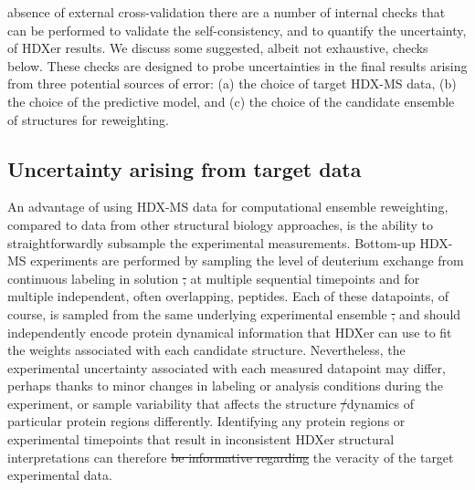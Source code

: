 \documentclass[9pt,tutorial]{livecoms}
\providecommand{\DIFadd}[1]{{\protect\color{blue}\uwave{#1}}} %
\providecommand{\DIFdel}[1]{{\protect\color{red}\sout{#1}}}                      %
\providecommand{\DIFaddbegin}{} %
\providecommand{\DIFaddend}{} %
\providecommand{\DIFdelbegin}{} %
\providecommand{\DIFdelend}{} %
\begin{document}
\DIFadd{In the }\DIFaddend absence of external cross-validation there are a number of internal checks that can be performed to validate the self-consistency, and to quantify the uncertainty, of HDXer results.
We discuss some suggested, albeit not exhaustive, checks below.
These checks are designed to probe uncertainties in the final results arising from three potential sources of error: (a) the choice of target HDX-MS data, (b) the choice of the predictive model, and (c) the choice of the candidate ensemble of structures for reweighting.

\subsection{Uncertainty arising from target data}\label{target_data_uncertainty_sect}
An advantage of using HDX-MS data for computational ensemble reweighting, compared to data from other structural biology approaches, is the ability to straightforwardly subsample the experimental measurements.
Bottom-up HDX-MS experiments are performed by sampling the level of deuterium exchange from continuous labeling in solution \DIFdelbegin \DIFdel{, }\DIFdelend at multiple sequential timepoints and for multiple independent, often overlapping, peptides.
Each of these datapoints, of course, is sampled from the same underlying experimental ensemble \DIFdelbegin \DIFdel{, }\DIFdelend and should independently encode protein dynamical information that HDXer can use to fit the weights associated with each candidate structure.
Nevertheless, the experimental uncertainty associated with each measured datapoint may differ, perhaps thanks to minor changes in labeling or analysis conditions during the experiment, or sample variability that affects the structure \DIFdelbegin \DIFdel{/}\DIFdelend \DIFaddbegin \DIFadd{or }\DIFaddend dynamics of particular protein regions differently.
Identifying any protein regions or experimental timepoints that result in inconsistent HDXer structural interpretations can therefore \DIFdelbegin \DIFdel{be informative regarding }\DIFdelend \DIFaddbegin \DIFadd{provide insight into }\DIFaddend the veracity of the target experimental data.
\end{document}
